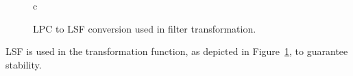 \begin{figure}[htbp]
	\centering
	\begin{tabular}[h]{c}
	\end{tabular}
	\caption{LPC to LSF conversion used in filter transformation.}
	\label{fig:lpc_to_lsf}
\end{figure}
LSF is used in the transformation function, as depicted in Figure~\ref{fig:lpc_to_lsf}, to guarantee stability.


% 
% 
% 
